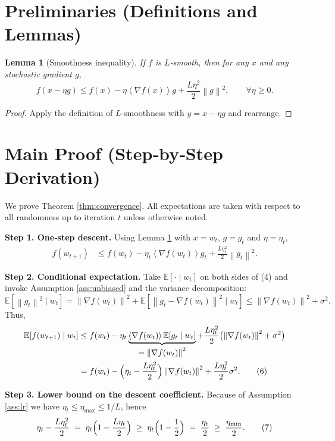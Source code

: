\documentclass{article}
\newtheorem{lemma}{Lemma}
\newcommand{\EE}{\mathbb{E}}
\newcommand{\norm}[1]{\left\lVert #1\right\rVert}
\newcommand{\inner}[1]{\left\langle #1\right\rangle}
\begin{document}
\newpage
\section*{Preliminaries (Definitions and Lemmas)}
\begin{lemma}[Smoothness inequality]\label{lem:smooth}
If $f$ is $L$‑smooth, then for any $x$ and any stochastic gradient $g$,
\[
f(x-\eta g)\le f(x)-\eta\inner{\nabla f(x)}{g}
               +\frac{L\eta^{2}}{2}\norm{g}^{2},
\qquad\forall \eta\ge 0 .
\]
\end{lemma}
\begin{proof}
Apply the definition of $L$‑smoothness with $y=x-\eta g$ and rearrange. \qedhere
\end{proof}

\section*{Main Proof (Step‑by‑Step Derivation)}
We prove Theorem \ref{thm:convergence}. All expectations are taken with respect to all randomness up to iteration $t$ unless otherwise noted.

\noindent\textbf{Step 1. One‑step descent.}  
Using Lemma \ref{lem:smooth} with $x=w_t$, $g=g_t$ and $\eta=\eta_t$,
\begin{align}
f(w_{t+1})
&\le f(w_t)-\eta_t\inner{\nabla f(w_t)}{g_t}
      +\frac{L\eta_t^{2}}{2}\norm{g_t}^{2}. \tag{4}
\end{align}

\noindent\textbf{Step 2. Conditional expectation.}  
Take $\EE[\cdot\mid w_t]$ on both sides of (4) and invoke Assumption \ref{ass:unbiased} and the variance decomposition:
\[
\EE\!\left[\norm{g_t}^{2}\mid w_t\right]
 =\norm{\nabla f(w_t)}^{2}
   +\EE\!\left[\norm{g_t-\nabla f(w_t)}^{2}\mid w_t\right]
 \le \norm{\nabla f(w_t)}^{2}+\sigma^{2}.
\tag{5}
\]
Thus,
\begin{align}
\EE\!\left[f(w_{t+1})\mid w_t\right]
&\le f(w_t)-\eta_t\underbrace{\inner{\nabla f(w_t)}{\EE[g_t\mid w_t]}}_{\displaystyle =\norm{\nabla f(w_t)}^{2}}
   +\frac{L\eta_t^{2}}{2}\bigl(\norm{\nabla f(w_t)}^{2}+\sigma^{2}\bigr) \nonumber\\
&= f(w_t)-\Bigl(\eta_t-\frac{L\eta_t^{2}}{2}\Bigr)\norm{\nabla f(w_t)}^{2}
   +\frac{L\eta_t^{2}}{2}\sigma^{2}. \tag{6}
\end{align}

\noindent\textbf{Step 3. Lower bound on the descent coefficient.}  
Because of Assumption \ref{ass:lr} we have $\eta_t\le\eta_{\max}\le 1/L$, hence
\[
\eta_t-\frac{L\eta_t^{2}}{2}
   \;=\;\eta_t\Bigl(1-\frac{L\eta_t}{2}\Bigr)
   \;\ge\;\eta_t\Bigl(1-\frac12\Bigr)
   \;=\;\frac{\eta_t}{2}
   \;\ge\;\frac{\eta_{\min}}{2}. \tag{7}
\]
\end{document}
